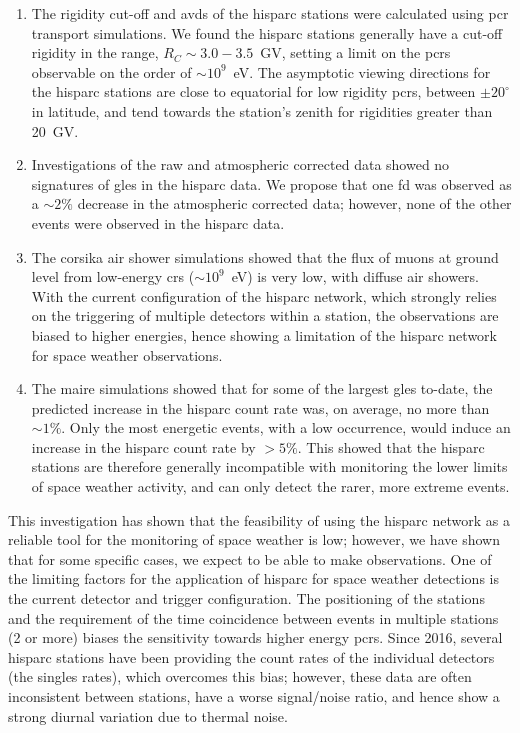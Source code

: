 \begin{enumerate}
	\item{The rigidity cut-off and \glspl{avd} of the \gls{hisparc} stations were calculated using \gls{pcr} transport simulations. We found the \gls{hisparc} stations generally have a cut-off rigidity in the range, $R_C \sim 3.0 - 3.5$~GV, setting a limit on the \glspl{pcr} observable on the order of $\sim 10^9$~eV. The asymptotic viewing directions for the \gls{hisparc} stations are close to equatorial for low rigidity \glspl{pcr}, between $\pm 20^{\circ}$ in latitude, and tend towards the station's zenith for rigidities greater than 20~GV.}
		
	\item{Investigations of the raw and atmospheric corrected data showed no signatures of \glspl{gle} in the \gls{hisparc} data. We propose that one \gls{fd} was observed as a $\sim 2\%$ decrease in the atmospheric corrected data; however, none of the other events were observed in the \gls{hisparc} data.}
	
	\item{The \gls{corsika} air shower simulations showed that the flux of muons at ground level from low-energy \glspl{cr} ($\sim 10^9$~eV) is very low, with diffuse air showers. With the current configuration of the \gls{hisparc} network, which strongly relies on the triggering of multiple detectors within a station, the observations are biased to higher energies, hence showing a limitation of the \gls{hisparc} network for space weather observations.}

	\item{The \gls{maire} simulations showed that for some of the largest \glspl{gle} to-date, the predicted increase in the \gls{hisparc} count rate was, on average, no more than $\sim 1\%$. Only the most energetic events, with a low occurrence, would induce an increase in the \gls{hisparc} count rate by $>5\%$. This showed that the \gls{hisparc} stations are therefore generally incompatible with monitoring the lower limits of space weather activity, and can only detect the rarer, more extreme events.}

\end{enumerate}

This investigation has shown that the feasibility of using the \gls{hisparc} network as a reliable tool for the monitoring of space weather is low; however, we have shown that for some specific cases, we expect to be able to make observations. One of the limiting factors for the application of \gls{hisparc} for space weather detections is the current detector and trigger configuration. The positioning of the stations and the requirement of the time coincidence between events in multiple stations (2 or more) biases the sensitivity towards higher energy \glspl{pcr}. Since 2016, several \gls{hisparc} stations have been providing the count rates of the individual detectors (the singles rates), which overcomes this bias; however, these data are often inconsistent between stations, have a worse signal/noise ratio, and hence show a strong diurnal variation due to thermal noise. 

